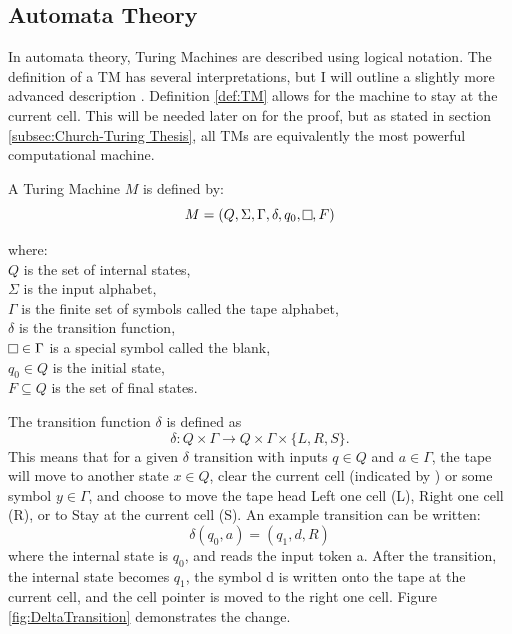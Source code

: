 \subsection{Automata Theory}\label{subsec:AutomataThy}

In automata theory, Turing Machines are described using logical notation.
The definition of a TM has several interpretations, but I will outline a slightly more advanced description \cite{IntroFormLangAuto,TuBB}.
Definition \ref{def:TM} allows for the machine to stay at the current cell.
This will be needed later on for the proof, but as stated in section \ref{subsec:Church-Turing Thesis}, all TMs are equivalently the most powerful computational machine.

\begin{definition}
    \label{def:TM}
    A Turing Machine $M$ is defined by:
        \[M = (Q, \Sigma ,\Gamma, \delta, q_{0}, \raisebox{0.1cm}{\fbox{}}, F)\]
        \par \hangindent=3cm 
        where: \\
        \( Q \) is the set of internal states,\\
        \( \Sigma \) is the input alphabet,\\
        \( \Gamma \) is the finite set of symbols called the tape alphabet,\\
        \( \delta \) is the transition function,\\
        \( \raisebox{0.1cm}{\fbox{}} \in \Gamma \) is a special symbol called the blank,\\
        \( q_{0} \in Q \) is the initial state,\\
        \( F \subseteq Q \) is the set of final states.
\end{definition}

The transition function $\delta$ is defined as \[\delta: Q \times \Gamma \rightarrow Q \times \Gamma \times \{L, R, S\}.\]
This means that for a given $\delta$ transition with inputs $q \in Q$ and $a \in \Gamma$, the tape will move to another state $x \in Q$, clear the current cell (indicated by \raisebox{0.1cm}{\fbox{}}) or some symbol $y \in \Gamma$, and choose to move the tape head Left one cell (L), Right one cell (R), or to Stay at the current cell (S).
An example transition can be written: \[\delta(q_{0}, a) = (q_{1}, d, R)\] where the internal state is $q_{0}$, and reads the input token a.
After the transition, the internal state becomes $q_{1}$, the symbol d is written onto the tape at the current cell, and the cell pointer is moved to the right one cell.
Figure \ref{fig:DeltaTransition} demonstrates the change.

